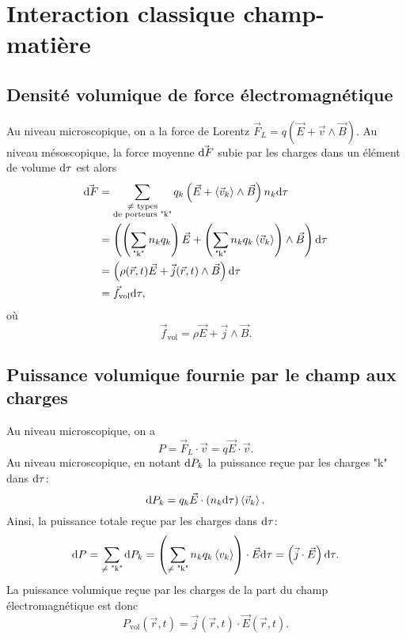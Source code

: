 \section{Interaction classique champ-matière}

\subsection{Densité volumique de force électromagnétique}

Au niveau microscopique, on a la force de Lorentz $\vec{F}_{L}=q\left(\vec{E}+\vec{v}\wedge\vec{B}\right)$. Au niveau mésoscopique, la force moyenne $\vec{\mathrm{d} F}$ subie par les charges dans un élément de volume $\mathrm{d}\tau$ est alors
\begin{align}
    \vec{\mathrm{d} F}
    &=
    \sum_{\substack{\neq\text{ types}\\\text{de porteurs "k"}}}q_k\left(\vec{E}+\left\langle \vec{v}_k\right\rangle\wedge\vec{B}\right)n_k\mathrm{d}\tau\\
    &=
    \left(\left(\sum_{\text{"k"}}n_k q_k\right)\vec{E}+\left(\sum_{\text{"k"}}n_k q_k \left\langle\vec{v}_k\right\rangle\right)\wedge\vec{B}\right)\mathrm{d}\tau\\
    &=
    \left(\rho(\vec{r},t)\vec{E}+\vec{j}(\vec{r},t)\wedge\vec{B}\right)\mathrm{d}\tau\\
    &=
    \vec{f}_{\mathrm{vol}}\mathrm{d}\tau,
\end{align}
où
\begin{equation}
    \boxed{
        \vec{f}_{\mathrm{vol}}=\rho\vec{E}+\vec{j}\wedge\vec{B}.
    }
\end{equation}

\subsection[Puissance volumique]{Puissance volumique fournie par le champ aux charges}

Au niveau microscopique, on a 
\begin{equation}
    P=\vec{F}_L\cdot\vec{v}=q\vec{E}\cdot\vec{v}.
\end{equation}
Au niveau microscopique, en notant $\mathrm{d} P_k$ la puissance reçue par les charges "k" dans $\mathrm{d}\tau$:
\begin{equation}
    \mathrm{d} P_k=
    q_k\vec{E}\cdot\left(n_k\mathrm{d}\tau\right)\left\langle \vec{v}_k\right\rangle.
\end{equation}
Ainsi, la puissance totale reçue par les charges dans $\mathrm{d}\tau$:
\begin{equation}
    \mathrm{d} P
    =
    \sum_{\neq \text{ "k"}}\mathrm{d} P_k
    =
    \left(\sum_{\neq \text{ "k"}}n_k q_k\left\langle v_k\right\rangle\right)\cdot\vec{E}\mathrm{d}\tau=\left(\vec{j}\cdot\vec{E}\right)\mathrm{d}\tau.
\end{equation}
La puissance volumique reçue par les charges de la part du champ électromagnétique est donc
\begin{equation}
    \boxed{
        P_{\mathrm{vol}}(\vec{r},t)=\vec{j}(\vec{r},t)\cdot\vec{E}(\vec{r},t).
    }
\end{equation}

